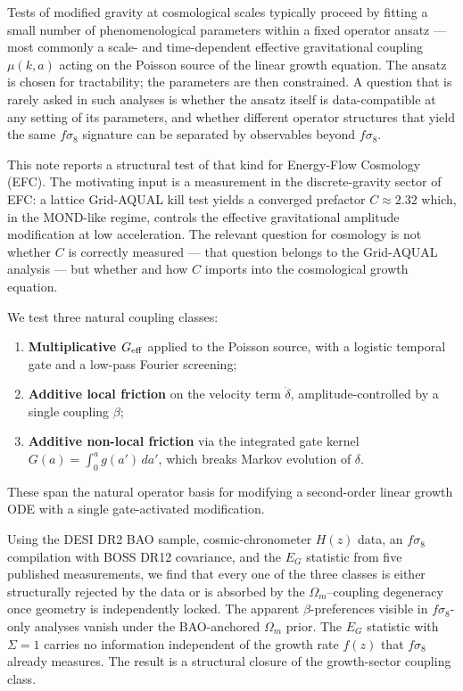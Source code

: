 \documentclass[11pt,a4paper]{article}
\begin{document}
Tests of modified gravity at cosmological scales typically proceed by fitting a small number of phenomenological parameters within a fixed operator ansatz --- most commonly a scale- and time-dependent effective gravitational coupling $\mu(k,a)$ acting on the Poisson source of the linear growth equation. The ansatz is chosen for tractability; the parameters are then constrained. A question that is rarely asked in such analyses is whether the ansatz itself is data-compatible at any setting of its parameters, and whether different operator structures that yield the same $f\sigma_8$ signature can be separated by observables beyond $f\sigma_8$.

This note reports a structural test of that kind for Energy-Flow Cosmology (EFC). The motivating input is a measurement in the discrete-gravity sector of EFC: a lattice Grid-AQUAL kill test yields a converged prefactor $C \approx 2.32$ which, in the MOND-like regime, controls the effective gravitational amplitude modification at low acceleration. The relevant question for cosmology is not whether $C$ is correctly measured --- that question belongs to the Grid-AQUAL analysis --- but whether and how $C$ imports into the cosmological growth equation.

We test three natural coupling classes:
\begin{enumerate}[nosep,leftmargin=1.8em]
    \item \textbf{Multiplicative $G_{\rm eff}$} applied to the Poisson source, with a logistic temporal gate and a low-pass Fourier screening;
    \item \textbf{Additive local friction} on the velocity term $\dot\delta$, amplitude-controlled by a single coupling $\beta$;
    \item \textbf{Additive non-local friction} via the integrated gate kernel $G(a) = \int_0^a g(a')\,da'$, which breaks Markov evolution of $\delta$.
\end{enumerate}
These span the natural operator basis for modifying a second-order linear growth ODE with a single gate-activated modification.

Using the DESI DR2 BAO sample, cosmic-chronometer $H(z)$ data, an $f\sigma_8$ compilation with BOSS DR12 covariance, and the $E_G$ statistic from five published measurements, we find that every one of the three classes is either structurally rejected by the data or is absorbed by the $\Omega_m$--coupling degeneracy once geometry is independently locked. The apparent $\beta$-preferences visible in $f\sigma_8$-only analyses vanish under the BAO-anchored $\Omega_m$ prior. The $E_G$ statistic with $\Sigma = 1$ carries no information independent of the growth rate $f(z)$ that $f\sigma_8$ already measures. The result is a structural closure of the growth-sector coupling class.
\end{document}
